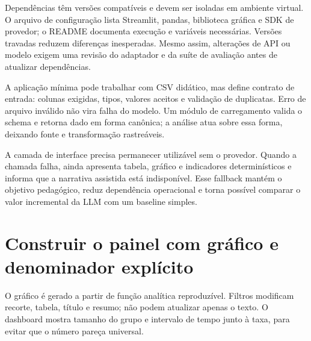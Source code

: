 Dependências têm versões compatíveis e devem ser isoladas em ambiente virtual. O arquivo de configuração lista Streamlit, pandas, biblioteca gráfica e SDK de provedor; o README documenta execução e variáveis necessárias. Versões travadas reduzem diferenças inesperadas. Mesmo assim, alterações de API ou modelo exigem uma revisão do adaptador e da suíte de avaliação antes de atualizar dependências.

A aplicação mínima pode trabalhar com CSV didático, mas define contrato de entrada: colunas exigidas, tipos, valores aceitos e validação de duplicatas. Erro de arquivo inválido não vira falha do modelo. Um módulo de carregamento valida o schema e retorna dado em forma canônica; a análise atua sobre essa forma, deixando fonte e transformação rastreáveis.

A camada de interface precisa permanecer utilizável sem o provedor. Quando a chamada falha, ainda apresenta tabela, gráfico e indicadores determinísticos e informa que a narrativa assistida está indisponível. Esse fallback mantém o objetivo pedagógico, reduz dependência operacional e torna possível comparar o valor incremental da LLM com um baseline simples.

\section{Construir o painel com gráfico e denominador explícito}

O gráfico é gerado a partir de função analítica reproduzível. Filtros modificam recorte, tabela, título e resumo; não podem atualizar apenas o texto. O dashboard mostra tamanho do grupo e intervalo de tempo junto à taxa, para evitar que o número pareça universal.

